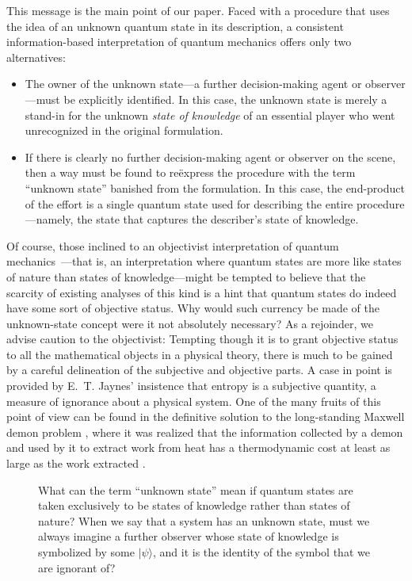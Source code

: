 \documentclass[12pt,aps,eqsecnum]{revtex4-1}
\begin{document}
This message is the main point of our paper.
Faced with a procedure that uses the
idea of an unknown quantum state in its description, a consistent
information-based interpretation of quantum mechanics offers only
two alternatives:
\begin{itemize}
\item
The owner of the unknown state---a further decision-making agent or
observer---must be explicitly identified.  In this case, the unknown
state is merely a stand-in for the unknown {\it state of
knowledge\/} of an essential player who went unrecognized in the
original formulation.
\item
If there is clearly no further decision-making agent or observer
on the scene, then a way must be found to re\"express the
procedure with the term ``unknown state'' banished from the
formulation. In this case, the end-product of the effort is a
single quantum state used for describing the entire
procedure---namely, the state that captures the describer's state
of knowledge.
\end{itemize}

Of course, those inclined to an objectivist interpretation of
quantum mechanics~\cite{Goldstein98}---that is, an interpretation
where quantum states are more like states of nature than states of
knowledge---might be tempted to believe that the scarcity of
existing analyses of this kind is a hint that quantum states do
indeed have some sort of objective status.  Why would such currency
be made of the unknown-state concept were it not absolutely
necessary?  As a rejoinder, we advise caution to the objectivist:
Tempting though it is to grant objective status to all the
mathematical objects in a physical theory, there is much to be
gained by a careful delineation of the subjective and objective
parts. A case in point is provided by E.~T. Jaynes'
\cite{Jaynes1957a,Jaynes1957b,Jaynes1983} insistence that entropy is
a subjective quantity, a measure of ignorance about a physical
system.  One of the many fruits of this point of view can be found in
the definitive solution \cite{Bennett1983} to the long-standing
Maxwell demon problem \cite{Leff1990}, where it was realized that the
information collected by a demon and used by it to extract work from
heat has a thermodynamic cost at least as large as the work extracted
\cite{Landauer1961}.

\begin{figure} \leavevmode
\epsfxsize=8cm  \bigskip\caption{What can the term
``unknown state'' mean if quantum states are taken exclusively to be
states of knowledge rather than states of nature?  When we say that
a system has an unknown state, must we always imagine a further
observer whose state of knowledge is symbolized by some
$|\psi\rangle$, and it is the identity of the symbol that we are
ignorant of?}
\end{figure}
\end{document}
